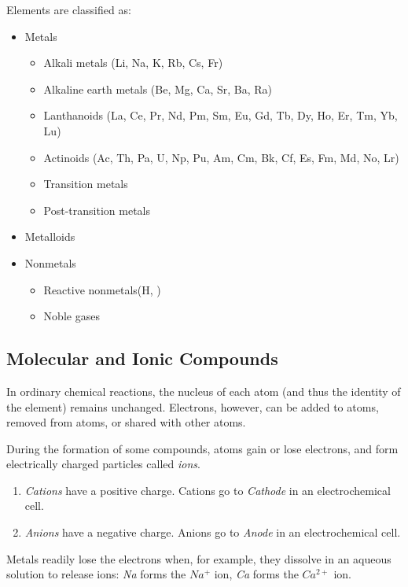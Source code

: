 \documentclass{article}
\begin{document}
Elements are classified as:
\begin{itemize}
    \item Metals
        \begin{itemize}
            \item Alkali metals (Li, Na, K, Rb, Cs, Fr)
            \item Alkaline earth metals (Be, Mg, Ca, Sr, Ba, Ra)
            \item Lanthanoids (La, Ce, Pr, Nd, Pm, Sm, Eu, Gd, Tb, Dy, Ho, Er, Tm, Yb, Lu)
            \item Actinoids (Ac, Th, Pa, U, Np, Pu, Am, Cm, Bk, Cf, Es, Fm, Md, No, Lr)
            \item Transition metals
            \item Post-transition metals
        \end{itemize}
    \item Metalloids
    \item Nonmetals
        \begin{itemize}
            \item Reactive nonmetals(H, ) 
            \item Noble gases
        \end{itemize}
\end{itemize}
\subsection{Molecular and Ionic Compounds}
\label{sec: molecular-ionic}

In ordinary chemical reactions, the nucleus of each atom (and thus the identity of the element) remains unchanged. Electrons, however, can be added to atoms, removed from atoms, or shared with other atoms. 

During the formation of some compounds, atoms gain or lose electrons, and form electrically charged particles called \emph{ions}.
\begin{enumerate}
    \item \emph{Cations} have a positive charge. Cations go to \emph{Cathode} in an electrochemical cell.
    \item \emph{Anions} have a negative charge. Anions go to \emph{Anode} in an electrochemical cell.
\end{enumerate}

Metals readily lose the electrons when, for example, they dissolve in an aqueous solution to release ions: \emph{Na} forms the $Na^+$ ion, \emph{Ca} forms the $Ca^{2+}$ ion.
\end{document}
